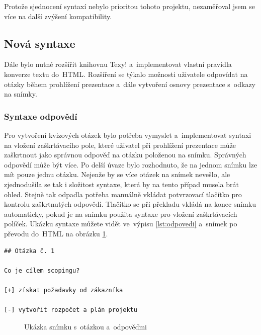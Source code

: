 \documentclass[11pt,twoside,a4paper]{book}
\begin{document}
Protože sjednocení syntaxí nebylo prioritou tohoto projektu, nezaměřoval jsem se více na další zvýšení kompatibility.


\subsection{Nová syntaxe}
Dále bylo nutné rozšířit knihovnu Texy! a~imple\-mentovat vlastní pravidla konverze textu do~HTML. Rozšíření se týkalo možnosti uživatele odpovídat na otázky během prohlížení prezentace a~dále vytvoření osnovy prezentace s~odkazy na snímky.

\subsubsection{Syntaxe odpovědí}
Pro vytvoření kvizových otázek bylo potřeba vymyslet a~imple\-mentovat syntaxi na vložení zaškrtávacího pole, které uživatel při prohlížení prezentace může zaškrtnout jako správnou odpověď na otázku položenou na snímku. Správných odpovědí může být více. Po delší úvaze bylo rozhodnuto, že na jednom snímku lze mít pouze jednu otázku. Nejenže by se více otázek na snímek nevešlo, ale zjednodušila se tak i složitost syntaxe, která by na tento případ musela brát ohled. Stejně tak odpadla potřeba manuálně vkládat potvrzovací tlačítko pro kontrolu zaškrtnutých odpovědí. Tlačítko se při překladu vkládá na konec snímku automaticky, pokud je na snímku použita syntaxe pro vložení zaškrtávacích políček. Ukázku syntaxe můžete vidět ve~výpisu \ref{lst:odpovedi} a~snímek po převodu do~HTML na obrázku \ref{fig:odpovedi}.

\begin{lstlisting}[caption={Ukázka zdrojového textu snímku s~otázkou a~odpovědmi},label={lst:odpovedi},captionpos=b]
## Otázka č. 1

Co je cílem scopingu?

[+] získat požadavky od zákazníka

[-] vytvořit rozpočet a plán projektu
\end{lstlisting}


\begin{figure}[H]
	\begin{center}
		\caption{Ukázka snímku s~otázkou a~odpověďmi}
		\label{fig:odpovedi}
	\end{center}
\end{figure}
\end{document}
